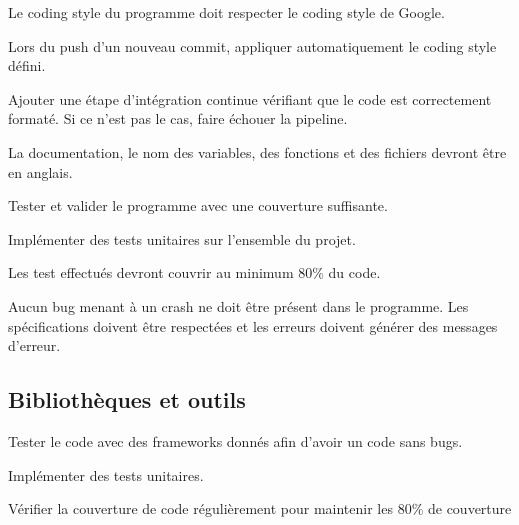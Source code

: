 \documentclass{article}
\begin{document}
\begin{nonfunctionnalneedbox}
    Le coding style du programme doit respecter le coding style de Google.
    \begin{subneedbox}
        Lors du push d'un nouveau commit, appliquer automatiquement le coding style défini.
    \end{subneedbox}
    \begin{subneedbox}
        Ajouter une étape d'intégration continue vérifiant que le code est correctement formaté.
        Si ce n'est pas le cas, faire échouer la pipeline.
    \end{subneedbox}
\end{nonfunctionnalneedbox}

\begin{nonfunctionnalneedbox}
    La documentation, le nom des variables, des fonctions et des fichiers devront être en anglais.
\end{nonfunctionnalneedbox}

\begin{nonfunctionnalneedbox}[F6. Tests]
    Tester et valider le programme avec une couverture suffisante.
    \begin{subneedbox}[F6.1 Tests]
        Implémenter des tests unitaires sur l'ensemble du projet.
    \end{subneedbox}

    \begin{subneedbox}[F6.2 Coverage]
        Les test effectués devront couvrir au minimum 80\% du code.
    \end{subneedbox}
\end{nonfunctionnalneedbox}

\begin{nonfunctionnalneedbox}[F7: Bugs]
    Aucun bug menant à un crash ne doit être présent dans le programme. Les spécifications doivent être respectées et les erreurs doivent générer des messages d'erreur.
\end{nonfunctionnalneedbox}

\subsection{Bibliothèques et outils}

\begin{nonfunctionnalneedbox}
    Tester le code avec des frameworks donnés afin d'avoir un code sans bugs.
    \begin{subneedbox}
        Implémenter des tests unitaires.
    \end{subneedbox}

    \begin{subneedbox}
        Vérifier la couverture de code régulièrement pour maintenir les 80\% de couverture
    \end{subneedbox}
\end{nonfunctionnalneedbox}
\end{document}
